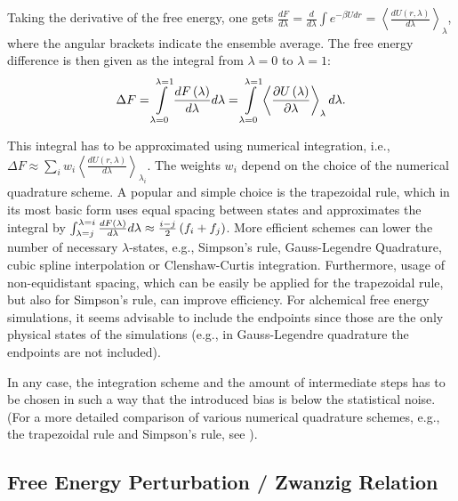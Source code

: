 Taking the derivative of the free energy, one gets $\frac{dF}{d\lambda}=\frac{d}{d\lambda}\int e^{-\beta U dr}=\left\langle \frac{dU\left(r,\lambda\right)}{d\lambda}\right\rangle _{\lambda}$\cite{Shirts.2013}, 
where the angular brackets indicate the ensemble average.
The free energy difference is then given as the integral from $\lambda=0$ to $\lambda=1$:
\begin{equation}
\Delta F=
\intop_{\lambda=0}^{\lambda=1}\frac{dF\left(\lambda\right)}{d\lambda}d\lambda=
\intop_{\lambda=0}^{\lambda=1}\left\langle\frac{\partial U\left(\lambda\right)}{\partial\lambda}\right\rangle_\lambda d\lambda
.
\end{equation}
\begin{sloppypar}This integral has to be approximated using numerical integration, i.e., $\Delta F\approx\sum_{i}w_{i}\left\langle \frac{dU\left(r,\lambda\right)}{d\lambda}\right\rangle _{\lambda_{i}}$.
The weights $w_{i}$ depend on the choice of the numerical quadrature scheme.
A popular and simple choice is the trapezoidal rule, which in its most basic form uses equal
spacing between states and approximates the integral by $\intop_{\lambda=j}^{\lambda=i}\frac{dF\left(\lambda\right)}{d\lambda}d\lambda\approx\frac{i-j}{2}\left(f_{i}+f_{j}\right)$.
More efficient schemes can lower the number of necessary ${\lambda}$-states, e.g., Simpson's rule, Gauss-Legendre Quadrature, cubic spline interpolation  or Clenshaw-Curtis integration. Furthermore, usage of non-equidistant spacing, which can be easily be applied for the trapezoidal rule, but also for Simpson's rule, can improve efficiency.
For alchemical free energy simulations, it seems advisable to include the endpoints since those are the only physical states of the simulations (e.g., in Gauss-Legendre quadrature the endpoints are not included). \cite{Bruckner.2011, Bruckner.2011b} \end{sloppypar}

In any case, the integration scheme and the amount of intermediate steps has to
be chosen in such a way that the introduced bias is below the statistical
noise\cite{Shirts.2013}. (For a more detailed comparison of various numerical quadrature
schemes, e.g., the trapezoidal rule and Simpson's rule, see \cite{Bruckner.2011b}). 

\subsection{Free Energy Perturbation / Zwanzig Relation}

